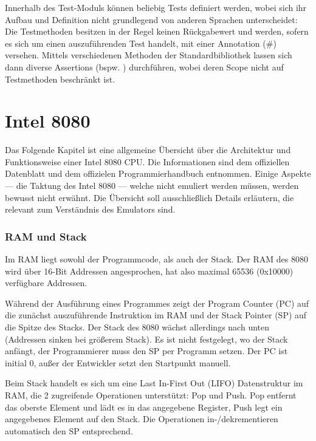 Innerhalb des Test-Moduls können beliebig Tests definiert werden, wobei sich ihr Aufbau und Definition nicht grundlegend von anderen Sprachen unterscheidet: Die Testmethoden besitzen in der Regel keinen Rückgabewert und werden, sofern es sich um einen auszuführenden Test handelt, mit einer Annotation (\#\rust{[test]}) versehen. Mittels verschiedenen Methoden der Standardbibliothek lassen sich dann diverse Assertions (bspw. ) durchführen, wobei deren Scope nicht auf Testmethoden beschränkt ist.

\section{Intel 8080}\label{chap:basics:intel8080}

Das Folgende Kapitel ist eine allgemeine Übersicht über die Architektur und Funktionsweise einer Intel 8080 CPU. Die Informationen sind dem offiziellen Datenblatt\cite{datasheet} und dem offizielen Programmierhandbuch\cite{progManual} entnommen.
Einige Aspekte --- \zB die Taktung des Intel 8080 --- welche nicht emuliert werden müssen, werden bewusst nicht erwähnt. Die Übersicht soll ausschließlich Details erläutern, die relevant zum Verständnis des Emulators sind.

\subsubsection{RAM und Stack}

Im \ac{RAM} liegt sowohl der Programmcode, als auch der Stack.
Der \ac{RAM} des 8080 wird über 16-Bit Addressen angesprochen, hat also maximal 65536 (0x10000) verfügbare Addressen.

Während der Ausführung eines Programmes zeigt der Program Counter (PC) auf die zunächst auszuführende Instruktion im \ac{RAM} und der Stack Pointer (SP) auf die Spitze des Stacks. Der Stack des 8080 wächst allerdings nach unten (Addressen sinken bei größerem Stack).
Es ist nicht festgelegt, wo der Stack anfängt, der Programmierer muss den SP per Programm setzen. Der PC ist initial 0, außer der Entwickler setzt den Startpunkt manuell.

Beim Stack handelt es sich um eine Last In-First Out (LIFO) Datenstruktur im \ac{RAM}, die 2 zugreifende Operationen unterstützt: Pop und Push. Pop entfernt das oberste Element und lädt es in das angegebene Register, Push legt ein angegebenes Element auf den Stack. Die Operationen in-/dekrementieren automatisch den SP entsprechend.

